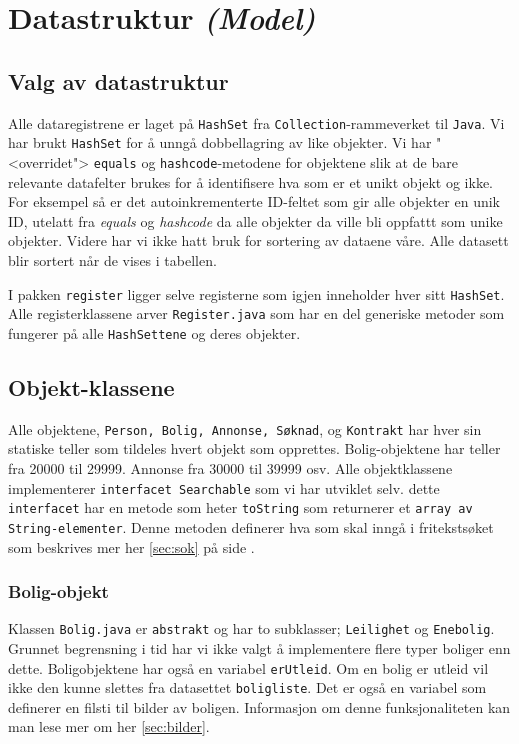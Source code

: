 \section{Datastruktur \emph{(Model)}} \label{sec:Datastruktur}

\subsection{Valg av datastruktur}
Alle dataregistrene er laget på \texttt{HashSet} fra \texttt{Collection}-rammeverket til \texttt{Java}. Vi har brukt \texttt{HashSet} for å unngå dobbellagring av like objekter. Vi har "<overridet"> \texttt{equals} og \texttt{hashcode}-metodene for objektene slik at de bare relevante datafelter brukes for å identifisere hva som er et unikt objekt og ikke. For eksempel så er det autoinkrementerte ID-feltet som gir alle objekter en unik ID, utelatt fra \emph{equals} og \emph{hashcode} da alle objekter da ville bli oppfattt som unike objekter.
Videre har vi ikke hatt bruk for sortering av dataene våre. Alle datasett blir sortert når de vises i tabellen.

I pakken \texttt{register} ligger selve registerne som igjen inneholder hver sitt \texttt{HashSet}. Alle registerklassene arver \texttt{Register.java} som har en del generiske metoder som fungerer på alle \texttt{HashSettene} og deres objekter.

\subsection{Objekt-klassene}
Alle objektene, \texttt{Person, Bolig, Annonse, Søknad}, og \texttt{Kontrakt} har hver sin statiske teller som tildeles hvert objekt som opprettes. Bolig-objektene har teller fra 20000 til 29999. Annonse fra 30000 til 39999 osv.
Alle objektklassene implementerer \texttt{interfacet Searchable} som vi har utviklet selv. dette \texttt{interfacet} har en metode som heter \texttt{toString} som returnerer et \texttt{array av String-elementer}. Denne metoden definerer hva som skal inngå i fritekstsøket som beskrives mer her \ref{sec:sok} på side \pageref{sec:sok}.

\subsubsection{Bolig-objekt}
Klassen \texttt{Bolig.java} er \texttt{abstrakt} og har to subklasser; \texttt{Leilighet} og \texttt{Enebolig}. Grunnet begrensning i tid har vi ikke valgt å implementere flere typer boliger enn dette.
Boligobjektene har også en variabel \texttt{erUtleid}. Om en bolig er utleid vil ikke den kunne slettes fra datasettet \texttt{boligliste}.
Det er også en variabel som definerer en filsti til bilder av boligen. Informasjon om denne funksjonaliteten kan man lese mer om her \ref{sec:bilder}.

